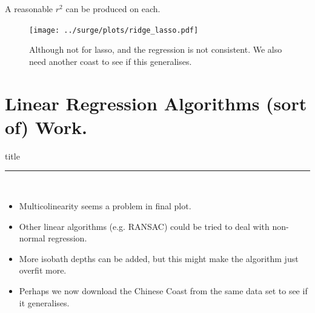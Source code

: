 \documentclass[usenames, dvipsnames]{beamer}
\begin{document}
\begin{frame}{A reasonable $r^2$ can be produced on each.}
\vspace{-15pt}
\hspace{-30pt}
 \begin{minipage}{1.0\textwidth}
\begin{figure}[htb!]
    \centering
    \texttt{[image: ../surge/plots/ridge\_lasso.pdf]}
    \vspace{-15pt}
   \caption{Although not for lasso, and the regression is not consistent.
            We also need another coast to see if this generalises.}
    \label{fig:A}
\end{figure}
\end{minipage}
\end{frame}


\section{Linear Regression Algorithms (sort of) Work. }
\begin{frame}[plain]
        \vfill
      \centering
      \begin{beamercolorbox}[sep=8pt,center,shadow=true,rounded=true]{title}
        \insertsectionhead\par%
        \color{oxfordblue}\noindent\rule{10cm}{1pt} \\
        \begin{itemize}
        \item Multicolinearity seems a problem in final plot.
        \item Other linear algorithms (e.g. RANSAC) could be tried
              to deal with non-normal regression.
        \item More isobath depths can be added, but this might make
              the algorithm just overfit more.
        \item Perhaps we now download the Chinese Coast from the same
              data set to see if it generalises.
        \end{itemize}
      \end{beamercolorbox}
      \vfill
\end{frame}
\end{document}
